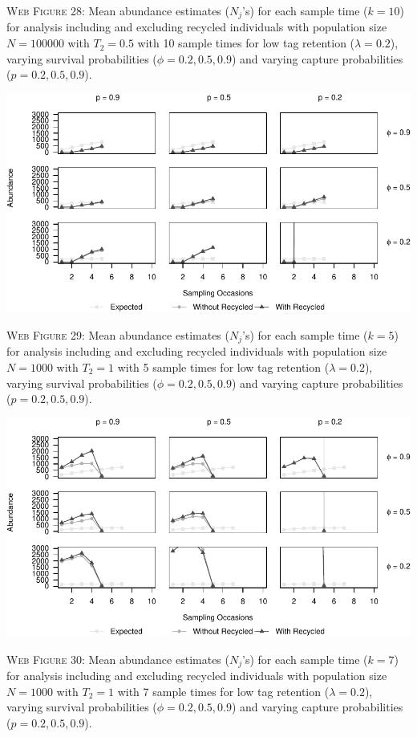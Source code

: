 \documentclass[]{article}
\begin{document}
\textsc{Web Figure 28:} Mean abundance estimates (\(N_j\)'s) for each
sample time (\(k=10\)) for analysis including and excluding recycled
individuals with population size \(N=100000\) with \(T_2=0.5\) with 10
sample times for low tag retention (\(\lambda=0.2\)), varying survival
probabilities (\(\phi=0.2,0.5,0.9\)) and varying capture probabilities
(\(p=0.2,0.5,0.9\)).

\newpage

\includegraphics{Appendix_BW_files/figure-latex/29_abundance_L_GJSTL5-1.pdf}

\textsc{Web Figure 29:} Mean abundance estimates (\(N_j\)'s) for each
sample time (\(k=5\)) for analysis including and excluding recycled
individuals with population size \(N=1000\) with \(T_2=1\) with 5 sample times for low tag retention (\(\lambda=0.2\)), varying survival
probabilities (\(\phi=0.2,0.5,0.9\)) and varying capture probabilities
(\(p=0.2,0.5,0.9\)).

\includegraphics{Appendix_BW_files/figure-latex/30_abundance_L_GJSTL6-1.pdf}

\textsc{Web Figure 30:} Mean abundance estimates (\(N_j\)'s) for each
sample time (\(k=7\)) for analysis including and excluding recycled
individuals with population size \(N=1000\) with \(T_2=1\) with 7 sample times
for low tag retention (\(\lambda=0.2\)), varying survival
probabilities (\(\phi=0.2,0.5,0.9\)) and varying capture probabilities
(\(p=0.2,0.5,0.9\)).
\end{document}
